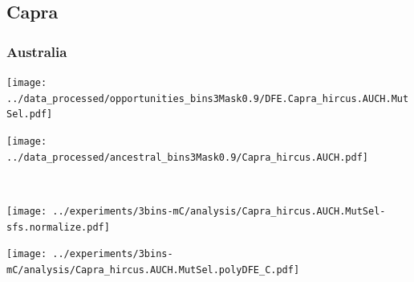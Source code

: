 \subsection{Capra}

\subsubsection{Australia}

\begin{minipage}{0.49\linewidth}
    \texttt{[image: ../data\_processed/opportunities\_bins3Mask0.9/DFE.Capra\_hircus.AUCH.MutSel.pdf]}
\end{minipage}
\begin{minipage}{0.49\linewidth}
    \texttt{[image: ../data\_processed/ancestral\_bins3Mask0.9/Capra\_hircus.AUCH.pdf]}
\end{minipage}
\\
\begin{minipage}{0.49\linewidth}
    \texttt{[image: ../experiments/3bins-mC/analysis/Capra\_hircus.AUCH.MutSel-sfs.normalize.pdf]}
\end{minipage}
\begin{minipage}{0.4\linewidth}
    \texttt{[image: ../experiments/3bins-mC/analysis/Capra\_hircus.AUCH.MutSel.polyDFE\_C.pdf]}
\end{minipage}

